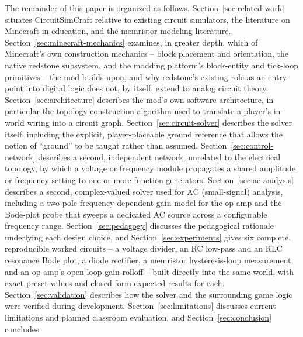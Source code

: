 The remainder of this paper is organized as follows. Section~\ref{sec:related-work}
situates CircuitSimCraft relative to existing circuit simulators, the literature on
Minecraft in education, and the memristor-modeling literature. Section~\ref{sec:minecraft-mechanics}
examines, in greater depth, which of Minecraft's own construction mechanics -- block
placement and orientation, the native redstone subsystem, and the modding platform's
block-entity and tick-loop primitives -- the mod builds upon, and why redstone's existing
role as an entry point into digital logic does not, by itself, extend to analog circuit
theory. Section~\ref{sec:architecture} describes the mod's own software architecture, in
particular the topology-construction algorithm used to translate a player's in-world wiring
into a circuit graph. Section~\ref{sec:circuit-solver} describes the solver itself,
including the explicit, player-placeable ground reference that allows the notion of
``ground'' to be taught rather than assumed. Section~\ref{sec:control-network} describes a
second, independent network, unrelated to the electrical topology, by which a voltage or
frequency module propagates a shared amplitude or frequency setting to one or more function
generators. Section~\ref{sec:ac-analysis} describes a second, complex-valued solver used for
AC (small-signal) analysis, including a two-pole frequency-dependent gain model for the
op-amp and the Bode-plot probe that sweeps a dedicated AC source across a configurable
frequency range. Section~\ref{sec:pedagogy} discusses the
pedagogical rationale underlying each design choice, and Section~\ref{sec:experiments} gives
six complete, reproducible worked circuits -- a voltage divider, an RC low-pass and an RLC
resonance Bode plot, a diode rectifier, a memristor hysteresis-loop measurement, and an
op-amp's open-loop gain rolloff -- built directly
into the same world, with exact preset values and closed-form expected results for each.
Section~\ref{sec:validation} describes
how the solver and the surrounding game logic were verified during development.
Section~\ref{sec:limitations} discusses current limitations and planned classroom
evaluation, and Section~\ref{sec:conclusion} concludes.
